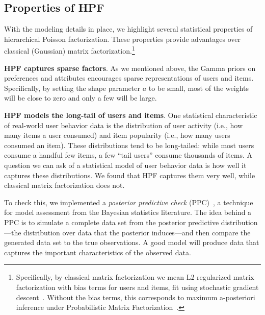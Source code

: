 \subsection{Properties of HPF}

With the modeling details in place, we highlight several statistical
properties of hierarchical Poisson factorization.  These properties
provide advantages over classical (Gaussian) matrix
factorization.\footnote{Specifically, by classical matrix
  factorization we mean L2 regularized matrix factorization with
  bias terms for users and items, fit using stochastic gradient
  descent~\cite{Koren:2009}. Without the bias terms, this corresponds
  to maximum a-posteriori inference under Probabilistic Matrix
  Factorization~\cite{Salakhutdinov:2008a}.}

{\bf HPF captures sparse factors}.  As we mentioned above, the Gamma
priors on preferences and attributes encourages sparse representations
of users and items.  Specifically, by setting the shape parameter $a$
to be small, most of the weights will be close to zero and only a few
will be large.


{\bf HPF models the long-tail of users and items}.  One statistical
characteristic of real-world user behavior data is the distribution of
user activity (i.e., how many items a user consumed) and item
popularity (i.e., how many users consumed an item).  These
distributions tend to be long-tailed: while most users consume a
handful few items, a few ``tail users'' consume thousands of items.  A
question we can ask of a statistical model of user behavior data is
how well it captures these distributions.  We found that HPF captures
them very well, while classical matrix factorization does not.

To check this, we implemented a \textit{posterior predictive check}
(PPC)~\cite{Rubin:1984,Gelman:1996}, a technique for model assessment
from the Bayesian statistics literature.  The idea behind a PPC is to
simulate a complete data set from the posterior predictive
distribution---the distribution over data that the posterior
induces---and then compare the generated data set to the true
observations. A good model will produce data that captures the
important characteristics of the observed data.


